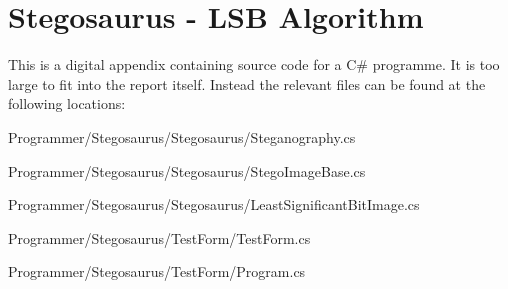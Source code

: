 \chapter{Stegosaurus - LSB Algorithm}
\label{app:A}
This is a digital appendix containing source code for a C\# programme. It is too large to fit into the report itself.
Instead the relevant files can be found at the following locations:

Programmer/Stegosaurus/Stegosaurus/Steganography.cs

Programmer/Stegosaurus/Stegosaurus/StegoImageBase.cs

Programmer/Stegosaurus/Stegosaurus/LeastSignificantBitImage.cs

Programmer/Stegosaurus/TestForm/TestForm.cs

Programmer/Stegosaurus/TestForm/Program.cs

%
%
%
%
%
